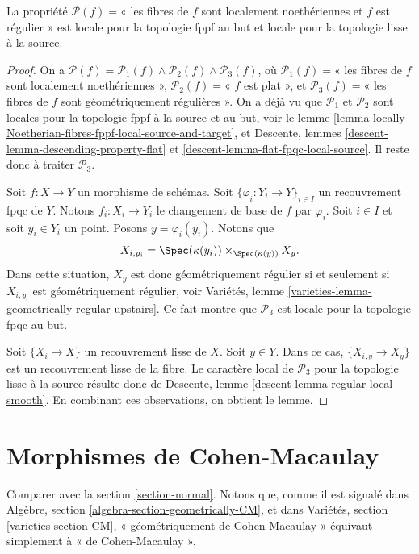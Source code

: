 \begin{lemma}
\label{lemma-regular-fppf-local-source-and-target}
La propriété $\mathcal{P}(f)=$« les fibres de $f$ sont
localement noethériennes et $f$ est régulier »
est locale pour la topologie fppf au but et
locale pour la topologie lisse à la source.
\end{lemma}

\begin{proof}
On a
$\mathcal{P}(f) =
\mathcal{P}_1(f) \wedge \mathcal{P}_2(f) \wedge \mathcal{P}_3(f)$,
où
$\mathcal{P}_1(f)=$« les fibres de $f$ sont localement noethériennes »,
$\mathcal{P}_2(f)=$« $f$ est plat », et
$\mathcal{P}_3(f)=$« les fibres de $f$ sont géométriquement régulières ».
On a déjà vu que $\mathcal{P}_1$ et $\mathcal{P}_2$
sont locales pour la topologie fppf à la source et au but, voir le
lemme \ref{lemma-locally-Noetherian-fibres-fppf-local-source-and-target},
et Descente, lemmes \ref{descent-lemma-descending-property-flat} et
\ref{descent-lemma-flat-fpqc-local-source}. Il reste donc à traiter
$\mathcal{P}_3$.

\medskip\noindent
Soit $f : X \to Y$ un morphisme de schémas.
Soit $\{\varphi_i : Y_i \to Y\}_{i \in I}$ un recouvrement fpqc de $Y$.
Notons $f_i : X_i \to Y_i$ le changement de base de $f$ par $\varphi_i$.
Soit $i \in I$ et soit $y_i \in Y_i$ un point.
Posons $y = \varphi_i(y_i)$. Notons que
$$
X_{i, y_i} = \Spec(\kappa(y_i)) \times_{\Spec(\kappa(y))} X_y.
$$
Dans cette situation, $X_y$ est donc géométriquement régulier si et
seulement si $X_{i, y_i}$ est géométriquement régulier, voir
Variétés, lemme \ref{varieties-lemma-geometrically-regular-upstairs}.
Ce fait montre que $\mathcal{P}_3$ est locale pour la topologie fpqc au but.

\medskip\noindent
Soit $\{X_i \to X\}$ un recouvrement lisse de $X$.
Soit $y \in Y$. Dans ce cas, $\{X_{i, y} \to X_y\}$ est un
recouvrement lisse de la fibre. Le caractère local de $\mathcal{P}_3$
pour la topologie lisse à la source résulte donc de
Descente, lemme \ref{descent-lemma-regular-local-smooth}.
En combinant ces observations, on obtient le lemme.
\end{proof}
\section{Morphismes de Cohen-Macaulay}
\label{section-CM}

\noindent
Comparer avec la section \ref{section-normal}.
Notons que, comme il est signalé dans
Algèbre, section \ref{algebra-section-geometrically-CM},
et dans
Variétés, section \ref{varieties-section-CM},
« géométriquement de Cohen-Macaulay » équivaut simplement à « de Cohen-Macaulay ».

